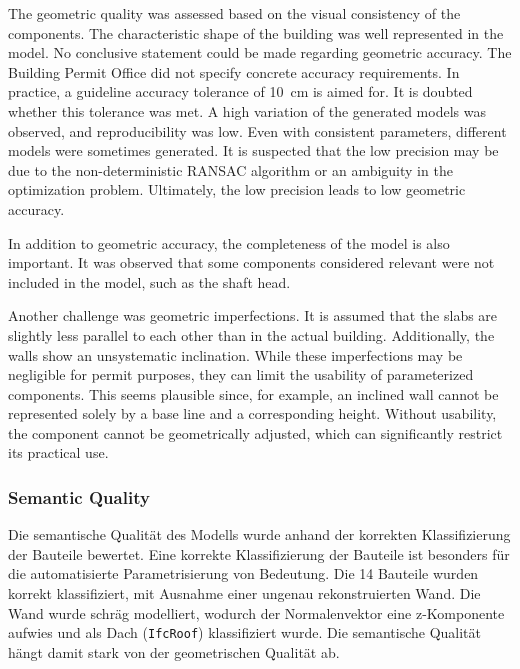 \begin{English}
    The geometric quality was assessed based on the visual consistency of the components. The characteristic shape of the building was well represented in the model. No conclusive statement could be made regarding geometric accuracy. The Building Permit Office did not specify concrete accuracy requirements. In practice, a guideline accuracy tolerance of 10~cm is aimed for. It is doubted whether this tolerance was met. A high variation of the generated models was observed, and reproducibility was low. Even with consistent parameters, different models were sometimes generated. It is suspected that the low precision may be due to the non-deterministic RANSAC algorithm or an ambiguity in the optimization problem. Ultimately, the low precision leads to low geometric accuracy.

    In addition to geometric accuracy, the completeness of the model is also important. It was observed that some components considered relevant were not included in the model, such as the shaft head.

    Another challenge was geometric imperfections. It is assumed that the slabs are slightly less parallel to each other than in the actual building. Additionally, the walls show an unsystematic inclination. While these imperfections may be negligible for permit purposes, they can limit the usability of parameterized components. This seems plausible since, for example, an inclined wall cannot be represented solely by a base line and a corresponding height. Without usability, the component cannot be geometrically adjusted, which can significantly restrict its practical use.
\end{English}

\subsubsection{Semantic Quality}
\begin{German}
    Die semantische Qualität des Modells wurde anhand der korrekten Klassifizierung der Bauteile bewertet. Eine korrekte Klassifizierung der Bauteile ist besonders für die automatisierte Parametrisierung von Bedeutung. Die 14 Bauteile wurden korrekt klassifiziert, mit Ausnahme einer ungenau rekonstruierten Wand. Die Wand wurde schräg modelliert, wodurch der Normalenvektor eine z-Komponente aufwies und als Dach (\texttt{IfcRoof}) klassifiziert wurde. Die semantische Qualität hängt damit stark von der geometrischen Qualität ab.
\end{German}

